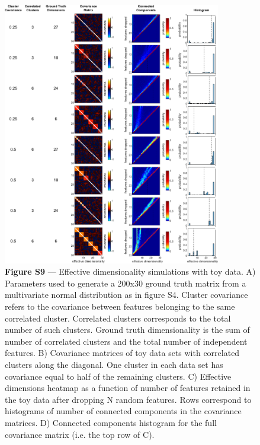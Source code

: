 \documentclass[12pt,letterpaper]{article}
\begin{document}
\begin{figure}[t!]
    \includegraphics[width=0.85\textwidth]{../figures/chapter_3/fig_s9.pdf}
    \vspace{.05in}
    \caption*{\textbf{Figure S9} — Effective dimensionality simulations with toy data. A) Parameters used to generate a 200x30 ground truth matrix from a multivariate normal distribution as in figure S4.  Cluster covariance refers to the covariance between features belonging to the same correlated cluster. Correlated clusters corresponds to the total number of such clusters. Ground truth dimensionality is the sum of number of correlated clusters and the total number of independent features. B) Covariance matrices of toy data sets with correlated clusters along the diagonal. One cluster in each data set has covariance equal to half of the remaining clusters. C) Effective dimensions heatmap as a function of number of features retained in the toy data after dropping N random features. Rows correspond to histograms of number of connected components in the covariance matrices. D) Connected components histogram for the full covariance matrix (i.e. the top row of C).}
\end{figure}
\clearpage
\end{document}
